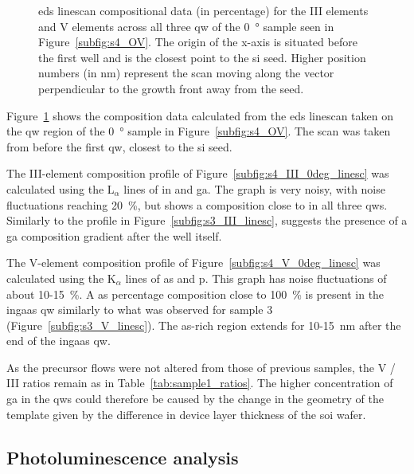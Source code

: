 \begin{figure}
{\begin{tikzpicture}
    \end{tikzpicture}
    }
    \caption{\acs{eds} linescan compositional data (in percentage) for the  III elements and  V elements across all three \acl{qw} of the \qty{0}{\degree} sample seen in Figure~\ref{subfig:s4_OV}. The origin of the x-axis is situated before the first well and is the closest point to the \acs{si} seed. Higher position numbers (in nm) represent the scan moving along the  vector perpendicular to the growth front away from the seed.}
    \label{fig:s4_0deg_linescans}
\end{figure}

Figure~\ref{fig:s4_0deg_linescans} shows the composition data calculated from the \acs{eds} linescan taken on the \acl{qw} region of the \qty{0}{\degree} sample in Figure~\ref{subfig:s4_OV}. The scan was taken from before the first \acl{qw}, closest to the \acs{si} seed.

The III-element composition profile of Figure~\ref{subfig:s4_III_0deg_linesc} was calculated using the L\(_\alpha\) lines of \acl{in} and \acl{ga}. The graph is very noisy, with noise fluctuations reaching \qty{20}{\%}, but shows a composition close to  in all three \acl{qw}s. Similarly to the profile in Figure~\ref{subfig:s3_III_linesc}, suggests the presence of a \acl{ga} composition gradient after the well itself. 

The V-element composition profile of Figure~\ref{subfig:s4_V_0deg_linesc} was calculated using the K\(_\alpha\) lines of \acl{as} and \acl{p}. This graph has noise fluctuations of about \num{10}-\qty{15}{\%}. A \acl{as} percentage composition close to \qty{100}{\%} is present in the \acs{ingaas} \acl{qw} similarly to what was observed for sample 3 (Figure~\ref{subfig:s3_V_linesc}). The \acs{as}-rich region extends for \num{10}-\qty{15}{\nano\metre} after the end of the \acs{ingaas} \acl{qw}.

As the precursor flows were not altered from those of previous samples, the V / III ratios remain as in Table~\ref{tab:sample1_ratios}. The higher concentration of \acl{ga} in the \acl{qw}s could therefore be caused by the change in the geometry of the template given by the difference in device layer thickness of the  \acs{soi} wafer.

\subsection{Photoluminescence analysis}

